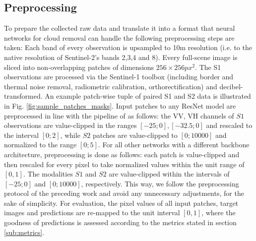 \documentclass[journal]{IEEEtran}
\begin{document}
\subsection{Preprocessing} \label{preprocessing}

To prepare the collected raw data and translate it into a format that neural networks for cloud removal can handle the following preprocessing steps are taken: Each band of every observation is upsampled to 10m resolution (i.e. to the native resolution of Sentinel-2's bands 2,3,4 and 8). Every full-scene image is sliced into non-overlapping patches of dimensions $256 \times 256 px^2$. The S1 observations are processed via the Sentinel-1 toolbox \cite{veci2014sentinel} (including border and thermal noise removal, radiometric calibration, orthorectification) and decibel-transformed. An example patch-wise tuple of paired S1 and S2 data is illustrated in Fig. \ref{fig:sample_patches_masks}. Input patches to any ResNet model \cite{he2016deep} are preprocessed in line with the pipeline of \cite{meraner2020cloud} as follows: the VV, VH channels of $S1$ observations are value-clipped in the ranges $[-25;0], [-32.5;0]$ and rescaled to the interval $[0;2]$, while $S2$ patches are value-clipped to $[0;10000]$ and normalized to the range $[0;5]$. For all other networks with a different backbone architecture, preprocessing is done as follows: each patch is value-clipped and then rescaled for every pixel to take normalized values within the unit range of $[0,1]$. The modalities $S1$ and $S2$ are value-clipped within the intervals of $[-25;0]$ and $[0;10000]$, respectively. This way, we follow the preprocessing protocol of the preceding work and avoid any unnecessary adjustments, for the sake of simplicity. For evaluation, the pixel values of all input patches, target images and predictions are re-mapped to the unit interval $[0,1]$, where the goodness of predictions is assessed according to the metrics stated in section \ref{sub:metrics}.
\end{document}
